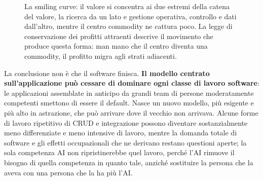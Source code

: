 \documentclass[10pt,oneside,openany]{book}
\begin{document}
\begin{figure}[!htbp]
\centering
{}
\caption{La smiling curve: il valore si concentra ai due estremi della catena del valore, la ricerca da un lato e gestione operativa, controllo e dati dall'altro, mentre il centro commodity ne cattura poco. La legge di conservazione dei profitti attraenti descrive il movimento che produce questa forma: man mano che il centro diventa una commodity, il profitto migra agli strati adiacenti.}
\label{fig:econ-patterns}
\end{figure}

La conclusione non è che il software finisca. \textbf{Il modello centrato sull'applicazione può cessare di dominare ogni classe di lavoro software}: le applicazioni assemblate in anticipo da grandi team di persone moderatamente competenti smettono di essere il default. Nasce un nuovo modello, più esigente e più alto in astrazione, che può arrivare dove il vecchio non arrivava. Alcune forme di lavoro ripetitivo di CRUD e integrazione possono diventare sostanzialmente meno differenziate e meno intensive di lavoro, mentre la domanda totale di software e gli effetti occupazionali che ne derivano restano questioni aperte; la sola competenza AI non ripristinerebbe quel lavoro, perché l'AI rimuove il bisogno di quella competenza in quanto tale, anziché sostituire la persona che la aveva con una persona che la ha più l'AI.
\end{document}
